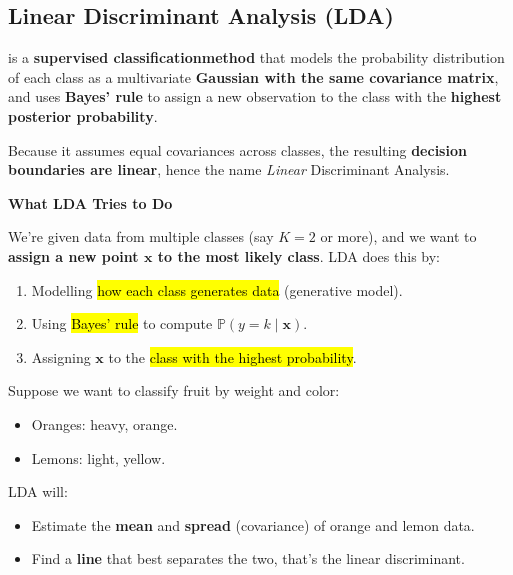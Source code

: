 \subsection{Linear Discriminant Analysis (LDA)}

 is a \textbf{supervised classification\break method} that models the probability distribution of each class as a multivariate \textbf{Gaussian with the same covariance matrix}, and uses \textbf{Bayes' rule} to assign a new observation to the class with the \textbf{highest posterior probability}.

\highspace
Because it assumes equal covariances across classes, the resulting \textbf{decision boundaries are linear}, hence the name \emph{Linear} Discriminant Analysis.

\highspace
\begin{flushleft}
    \textcolor{Green3}{ \textbf{What LDA Tries to Do}}
\end{flushleft}
We're given data from multiple classes (say $K = 2$ or more), and we want to \textbf{assign a new point $\mathbf{x}$ to the most likely class}. LDA does this by:
\begin{enumerate}
    \item Modelling \hl{how each class generates data} (generative model).
    \item Using \hl{Bayes' rule} to compute $\mathbb{P}\left(y = k \mid \mathbf{x}\right)$.
    \item Assigning $\mathbf{x}$ to the \hl{class with the highest probability}.
\end{enumerate}

\highspace
\begin{examplebox}[: LDA]
    Suppose we want to classify fruit by weight and color:
    \begin{itemize}
        \item Oranges: heavy, orange.
        \item Lemons: light, yellow.
    \end{itemize}
    LDA will:
    \begin{itemize}
        \item Estimate the \textbf{mean} and \textbf{spread} (covariance) of orange and lemon data.
        \item Find a \textbf{line} that best separates the two, that's the linear discriminant.
    \end{itemize}
\end{examplebox}

